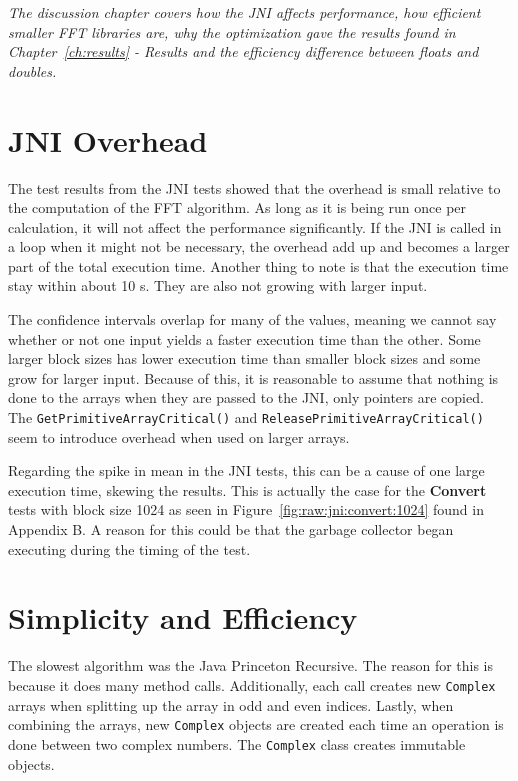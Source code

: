 \textit{The discussion chapter covers how the JNI affects performance, how efficient smaller FFT libraries are, why the optimization gave the results found in Chapter~\ref{ch:results} - Results and the efficiency difference between floats and doubles.}

\section{JNI Overhead}
The test results from the JNI tests showed that the overhead is small relative to the computation of the FFT algorithm. As long as it is being run once per calculation, it will not affect the performance significantly. If the JNI is called in a loop when it might not be necessary, the overhead add up and becomes a larger part of the total execution time. Another thing to note is that the execution time stay within about 10 \textmu s. They are also not growing with larger input.

The confidence intervals overlap for many of the values, meaning we cannot say whether or not one input yields a faster execution time than the other. Some larger block sizes has lower execution time than smaller block sizes and some grow for larger input. Because of this, it is reasonable to assume that nothing is done to the arrays when they are passed to the JNI, only pointers are copied. The \texttt{GetPrimitiveArrayCritical()} and \texttt{ReleasePrimitiveArrayCritical()} seem to introduce overhead when used on larger arrays. %

Regarding the spike in mean in the JNI tests, this can be a cause of one large execution time, skewing the results. This is actually the case for the \textbf{Convert} tests with block size 1024 as seen in Figure~\ref{fig:raw:jni:convert:1024} found in Appendix B. A reason for this could be that the garbage collector began executing during the timing of the test.


\section{Simplicity and Efficiency} %

The slowest algorithm was the Java Princeton Recursive. The reason for this is because it does many method calls. Additionally, each call creates new \texttt{Complex} arrays when splitting up the array in odd and even indices. Lastly, when combining the arrays, new \texttt{Complex} objects are created each time an operation is done between two complex numbers. The \texttt{Complex} class creates immutable objects.

